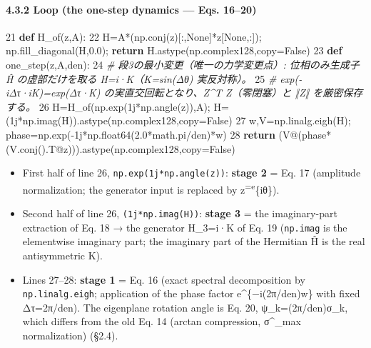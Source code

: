 \documentclass[
  a4paper,
]{ltjsarticle}
\newenvironment{Shaded}{}{}
\newcommand{\CommentTok}[1]{\textcolor[rgb]{0.38,0.63,0.69}{\textit{#1}}}
\newcommand{\ControlFlowTok}[1]{\textcolor[rgb]{0.00,0.44,0.13}{\textbf{#1}}}
\newcommand{\DecValTok}[1]{\textcolor[rgb]{0.25,0.63,0.44}{#1}}
\newcommand{\FloatTok}[1]{\textcolor[rgb]{0.25,0.63,0.44}{#1}}
\newcommand{\KeywordTok}[1]{\textcolor[rgb]{0.00,0.44,0.13}{\textbf{#1}}}
\newcommand{\NormalTok}[1]{#1}
\newcommand{\OperatorTok}[1]{\textcolor[rgb]{0.40,0.40,0.40}{#1}}
\newcommand{\OtherTok}[1]{\textcolor[rgb]{0.00,0.44,0.13}{#1}}
\newcommand{\VariableTok}[1]{\textcolor[rgb]{0.10,0.09,0.49}{#1}}
\providecommand{\tightlist}{%
  \setlength{\itemsep}{0pt}\setlength{\parskip}{0pt}}
\begin{document}
\paragraph{4.3.2 Loop (the one-step dynamics --- Eqs.
16--20)}\label{loop-the-one-step-dynamics-eqs.-1620}

\begin{Shaded}
\begin{Highlighting}[]
    \DecValTok{21}  \KeywordTok{def}\NormalTok{ H\_of(z,A):}
    \DecValTok{22}\NormalTok{      H}\OperatorTok{=}\NormalTok{A}\OperatorTok{*}\NormalTok{(np.conj(z)[:,}\VariableTok{None}\NormalTok{]}\OperatorTok{*}\NormalTok{z[}\VariableTok{None}\NormalTok{,:])}\OperatorTok{;}\NormalTok{ np.fill\_diagonal(H,}\FloatTok{0.0}\NormalTok{)}\OperatorTok{;} \ControlFlowTok{return}\NormalTok{ H.astype(np.complex128,copy}\OperatorTok{=}\VariableTok{False}\NormalTok{)}
    \DecValTok{23}  \KeywordTok{def}\NormalTok{ one\_step(z,A,den):}
    \DecValTok{24}      \CommentTok{\# 段3の最小変更（唯一の力学変更点）: 位相のみ生成子 Ĥ の虚部だけを取る H=i·K（K=sin(Δθ) 実反対称）。}
    \DecValTok{25}      \CommentTok{\# exp({-}iΔτ·iK)=exp(Δτ·K) の実直交回転となり、Z\^{}T Z（零閉塞）と ‖Z‖ を厳密保存する。}
    \DecValTok{26}\NormalTok{      H}\OperatorTok{=}\NormalTok{H\_of(np.exp(}\OtherTok{1j}\OperatorTok{*}\NormalTok{np.angle(z)),A)}\OperatorTok{;}\NormalTok{ H}\OperatorTok{=}\NormalTok{(}\OtherTok{1j}\OperatorTok{*}\NormalTok{np.imag(H)).astype(np.complex128,copy}\OperatorTok{=}\VariableTok{False}\NormalTok{)}
    \DecValTok{27}\NormalTok{      w,V}\OperatorTok{=}\NormalTok{np.linalg.eigh(H)}\OperatorTok{;}\NormalTok{ phase}\OperatorTok{=}\NormalTok{np.exp(}\OperatorTok{{-}}\OtherTok{1j}\OperatorTok{*}\NormalTok{np.float64(}\FloatTok{2.0}\OperatorTok{*}\NormalTok{math.pi}\OperatorTok{/}\NormalTok{den)}\OperatorTok{*}\NormalTok{w)}
    \DecValTok{28}      \ControlFlowTok{return}\NormalTok{ (V}\OperatorTok{@}\NormalTok{(phase}\OperatorTok{*}\NormalTok{(V.conj().T}\OperatorTok{@}\NormalTok{z))).astype(np.complex128,copy}\OperatorTok{=}\VariableTok{False}\NormalTok{)}
\end{Highlighting}
\end{Shaded}

\begin{itemize}
\tightlist
\item
  First half of line 26, \texttt{np.exp(1j*np.angle(z))}: \textbf{stage
  2} = Eq. 17 (amplitude normalization; the generator input is replaced
  by z\textsuperscript{=e}\{iθ\}).
\item
  Second half of line 26, \texttt{(1j*np.imag(H))}: \textbf{stage 3} =
  the imaginary-part extraction of Eq. 18 → the generator H\_3=i·K of
  Eq. 19 (\texttt{np.imag} is the elementwise imaginary part; the
  imaginary part of the Hermitian Ĥ is the real antisymmetric K).
\item
  Lines 27--28: \textbf{stage 1} = Eq. 16 (exact spectral decomposition
  by \texttt{np.linalg.eigh}; application of the phase factor
  e\^{}\{−i(2π/den)w\} with fixed Δτ=2π/den). The eigenplane rotation
  angle is Eq. 20, ψ\_k=(2π/den)σ\_k, which differs from the old Eq. 14
  (arctan compression, σ\^{}\_max normalization) (§2.4).
\end{itemize}
\end{document}
